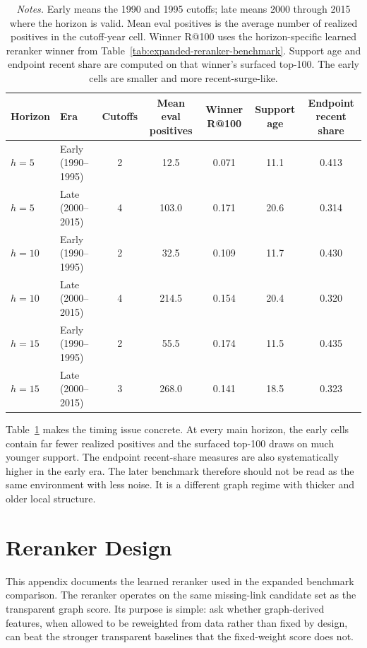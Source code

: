 \documentclass[11pt]{article}
\newcommand{\fignotes}[1]{\caption*{\textit{Notes.} #1}}
\begin{document}
\begin{table}[h]
  \caption{Early and late benchmark cells are different benchmark regimes}
  \label{tab:early-late-regime}
  \centering
  \small
  \begin{tabular}{llccccc}
    \toprule
    Horizon & Era & Cutoffs & Mean eval positives & Winner R@100 & Support age & Endpoint recent share \\
    \midrule
    \(h=5\) & Early (1990--1995) & 2 & 12.5 & 0.071 & 11.1 & 0.413 \\
    \(h=5\) & Late (2000--2015) & 4 & 103.0 & 0.171 & 20.6 & 0.314 \\
    \(h=10\) & Early (1990--1995) & 2 & 32.5 & 0.109 & 11.7 & 0.430 \\
    \(h=10\) & Late (2000--2015) & 4 & 214.5 & 0.154 & 20.4 & 0.320 \\
    \(h=15\) & Early (1990--1995) & 2 & 55.5 & 0.174 & 11.5 & 0.435 \\
    \(h=15\) & Late (2000--2015) & 3 & 268.0 & 0.141 & 18.5 & 0.323 \\
    \bottomrule
  \end{tabular}
  \fignotes{Early means the 1990 and 1995 cutoffs; late means 2000 through 2015 where the horizon is valid. Mean eval positives is the average number of realized positives in the cutoff-year cell. Winner R@100 uses the horizon-specific learned reranker winner from Table~\ref{tab:expanded-reranker-benchmark}. Support age and endpoint recent share are computed on that winner's surfaced top-100. The early cells are smaller and more recent-surge-like.}
\end{table}

Table~\ref{tab:early-late-regime} makes the timing issue concrete. At every main horizon, the early cells contain far fewer realized positives and the surfaced top-100 draws on much younger support. The endpoint recent-share measures are also systematically higher in the early era. The later benchmark therefore should not be read as the same environment with less noise. It is a different graph regime with thicker and older local structure.

\section{Reranker Design}
\label{app:reranker-design}

This appendix documents the learned reranker used in the expanded benchmark comparison. The reranker operates on the same missing-link candidate set as the transparent graph score. Its purpose is simple: ask whether graph-derived features, when allowed to be reweighted from data rather than fixed by design, can beat the stronger transparent baselines that the fixed-weight score does not.
\end{document}

